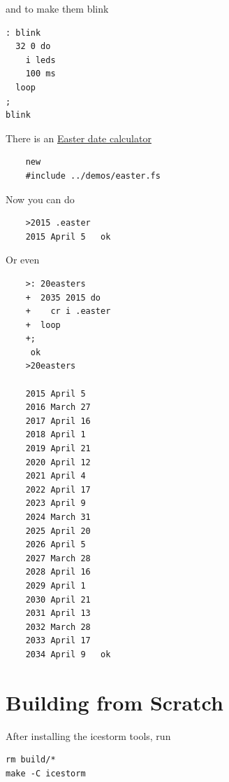 \documentclass[10pt]{book}
\begin{document}
\noindent
and to make them blink

\begin{framed}
\begin{Verbatim}[commandchars=\\\{\}]
: blink
  32 0 do
    i leds
    100 ms
  loop
;
blink
\end{Verbatim}
\end{framed}

There is an
\href{http://www.wilbaden.com/neil_bawd/easter.txt}{Easter date calculator}
 

\begin{framed}
\begin{Verbatim}
    new
    #include ../demos/easter.fs
\end{Verbatim}
\end{framed}
    
Now you can do

\begin{framed}
\begin{Verbatim}
    >2015 .easter
    2015 April 5   ok
\end{Verbatim}
\end{framed}

Or even

\begin{framed}
\begin{Verbatim}
    >: 20easters
    +  2035 2015 do
    +    cr i .easter
    +  loop
    +;
     ok
    >20easters

    2015 April 5 
    2016 March 27 
    2017 April 16 
    2018 April 1 
    2019 April 21 
    2020 April 12 
    2021 April 4 
    2022 April 17 
    2023 April 9 
    2024 March 31 
    2025 April 20 
    2026 April 5 
    2027 March 28 
    2028 April 16 
    2029 April 1 
    2030 April 21 
    2031 April 13 
    2032 March 28 
    2033 April 17 
    2034 April 9   ok
\end{Verbatim}
\end{framed}

\section{Building from Scratch}

After installing the icestorm tools, run

\begin{Verbatim}
rm build/*
make -C icestorm
\end{Verbatim}
\end{document}
